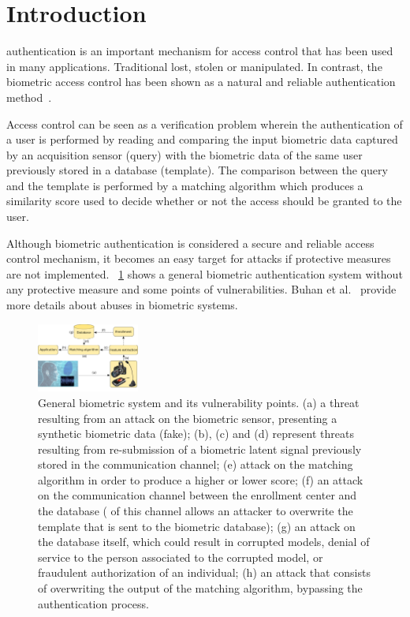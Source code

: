\documentclass[journal]{IEEEtran}
\providecommand{\rv}[1]{{\protect\color{black}{#1}}}
\providecommand{\rrv}[1]{{\protect\color{black}{#1}}}
\begin{document}
\IEEEpeerreviewmaketitle

\section{Introduction}
\label{Introduction}

 authentication is an important mechanism for access control that has been used in many applications. Traditional \rv{methods, including the ones based on knowledge (e.g., keywords, secret question) or based on tokens (e.g., smart cards), might be ineffective since they are easily shared,} lost, stolen or manipulated. In contrast, the biometric access control has been shown as a natural and reliable authentication method~\cite{Jain:HB:2008}.

Access control can be seen as a verification problem wherein the authentication of a user is performed by reading and comparing the input biometric data captured by an acquisition sensor (query) with the biometric data of the same user previously stored in a database (template). The comparison between the query and the template is performed by a matching algorithm which produces a similarity score used to decide whether or not the access should be granted to the user.

Although biometric authentication is considered a secure and reliable access control mechanism, it becomes an easy target for attacks if protective measures are not implemented. \rrv{Fig.}~\ref{biometricsystem} shows a general biometric authentication system without any protective measure and some points of vulnerabilities. Buhan et al.~\cite{Buhan:CTITUT:2005} provide more details about abuses in biometric systems. 

\begin{figure}[!htb]
\centering
\includegraphics[width=0.3\textwidth]{figure-01.pdf}
\caption{General biometric system and its vulnerability points. (a) a threat resulting from an attack on the biometric sensor, presenting a synthetic biometric data (fake); (b), (c) and (d) represent threats resulting from re-submission of a biometric latent signal previously stored in the communication channel; (e) attack on the matching algorithm in order to produce a higher or lower score; (f) an attack on the communication channel between the enrollment center and the database (\rv{the  control} of this channel allows an attacker to overwrite the template that is sent to the biometric database); (g) an attack on the database itself, which could result in corrupted models, denial of service to the person associated to the corrupted model, or fraudulent authorization of an individual; (h) an attack that consists of overwriting the output of the matching algorithm, bypassing the authentication process.}
\label{biometricsystem}
\end{figure}
\end{document}
